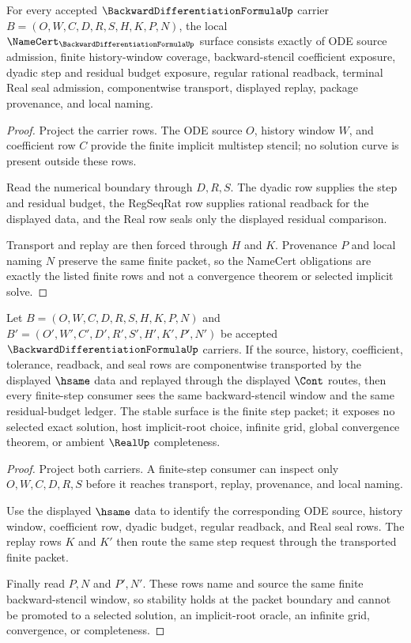 \begin{theorem}
\label{thm:backward-differentiation-formula-namecert-obligations}
For every accepted $\BackwardDifferentiationFormulaUp$ carrier $B=(O,W,C,D,R,S,H,K,P,N)$, the local $\NameCert_{\BackwardDifferentiationFormulaUp}$ surface consists exactly of ODE source admission, finite history-window coverage, backward-stencil coefficient exposure, dyadic step and residual budget exposure, regular rational readback, terminal Real seal admission, componentwise transport, displayed replay, package provenance, and local naming.
\end{theorem}
\begin{proof}
Project the carrier rows. The ODE source $O$, history window $W$, and coefficient row $C$ provide the finite implicit multistep stencil; no solution curve is present outside these rows.

Read the numerical boundary through $D,R,S$. The dyadic row supplies the step and residual budget, the RegSeqRat row supplies rational readback for the displayed data, and the Real row seals only the displayed residual comparison.

Transport and replay are then forced through $H$ and $K$. Provenance $P$ and local naming $N$ preserve the same finite packet, so the NameCert obligations are exactly the listed finite rows and not a convergence theorem or selected implicit solve.
\end{proof}

\begin{theorem}
\label{thm:backward-differentiation-formula-window-stability}
Let $B=(O,W,C,D,R,S,H,K,P,N)$ and $B'=(O',W',C',D',R',S',H',K',P',N')$ be accepted $\BackwardDifferentiationFormulaUp$ carriers. If the source, history, coefficient, tolerance, readback, and seal rows are componentwise transported by the displayed $\hsame$ data and replayed through the displayed $\Cont$ routes, then every finite-step consumer sees the same backward-stencil window and the same residual-budget ledger. The stable surface is the finite step packet; it exposes no selected exact solution, host implicit-root choice, infinite grid, global convergence theorem, or ambient $\RealUp$ completeness.
\end{theorem}
\begin{proof}
Project both carriers. A finite-step consumer can inspect only $O,W,C,D,R,S$ before it reaches transport, replay, provenance, and local naming.

Use the displayed $\hsame$ data to identify the corresponding ODE source, history window, coefficient row, dyadic budget, regular readback, and Real seal rows. The replay rows $K$ and $K'$ then route the same step request through the transported finite packet.

Finally read $P,N$ and $P',N'$. These rows name and source the same finite backward-stencil window, so stability holds at the packet boundary and cannot be promoted to a selected solution, an implicit-root oracle, an infinite grid, convergence, or completeness.
\end{proof}

